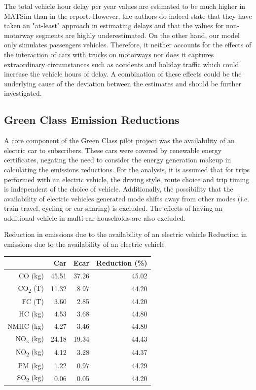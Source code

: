 The total vehicle hour delay per year values are estimated to be much higher in MATSim than in the report.
However, the authors do indeed state that they have taken an "at-least" approach in estimating delays and that the values for non-motorway segments are highly underestimated.
On the other hand, our model only simulates passengers vehicles.
Therefore, it neither accounts for the effects of the interaction of cars with trucks on motorways nor does it captures extraordinary circumstances such as accidents and holiday traffic which could increase the vehicle hours of delay.
A combination of these effects could be the underlying cause of the deviation between the estimates and should be further investigated.


\subsection{Green Class Emission Reductions}
A core component of the Green Class pilot project was the availability of an electric car to subscribers. These cars were covered by renewable energy certificates, negating the need to consider the energy generation makeup in calculating the emissions reductions. For the analysis, it is assumed that for trips performed with an electric vehicle, the driving style, route choice and trip timing is independent of the choice of vehicle. Additionally, the possibility that the availability of electric vehicles generated mode shifts away from other modes (i.e. train travel, cycling or car sharing) is excluded. 
The effects of having an additional vehicle in multi-car households are also excluded. 

\createtable%
{Reduction in emissions due to the availability of an electric vehicle}%
{Reduction in emissions due to the availability of an electric vehicle}%
{\label{tab:reduction_summary}}%
{%
\begin{tabular}{rrrr}
  \hline
 & Car & Ecar & Reduction (\%) \\ 
  \hline
CO (kg) & 45.51 & 37.26 & 45.02 \\ 
  CO\textsubscript{2} (T) & 11.32 & 8.97 & 44.20 \\ 
  FC (T) & 3.60 & 2.85 & 44.20 \\ 
  HC (kg) & 4.53 & 3.68 & 44.80 \\ 
  NMHC (kg) & 4.27 & 3.46 & 44.80 \\ 
  NO\textsubscript{x} (kg) & 24.18 & 19.34 & 44.43 \\ 
  NO\textsubscript{2} (kg) & 4.12 & 3.28 & 44.37 \\ 
  PM (kg) & 1.22 & 0.97 & 44.29 \\ 
  SO\textsubscript{2} (kg) & 0.06 & 0.05 & 44.20 \\ 
   \hline
\end{tabular}
}%
{}

